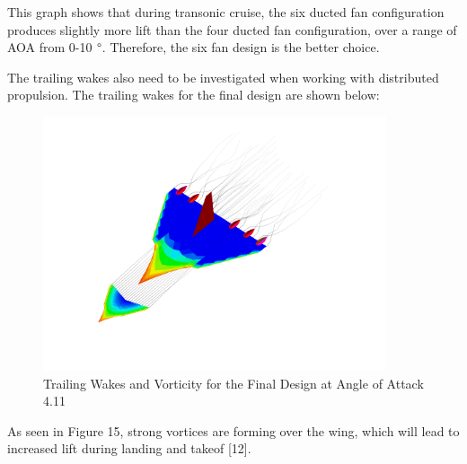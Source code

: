 \documentclass{article}
\begin{document}
This graph shows that during transonic cruise, the six ducted fan configuration produces slightly more lift than the four ducted fan configuration, over a range of AOA from 0-10 ${\degree}$. Therefore, the six fan design is the better choice. 

The trailing wakes also need to be investigated when working with distributed propulsion. The trailing wakes for the final design are shown below: 
\begin{figure}[H]
    \centering
    \includegraphics[width = 0.90\textwidth]{Figures/TrailingWakes.png}
    \caption{Trailing Wakes and Vorticity for the Final Design at Angle of Attack 4.11}
    \label{fig:TrailingWakes}
\end{figure}

As seen in Figure 15, strong vortices are forming over the wing, which will lead to increased lift during landing and takeof [12].
\end{document}
